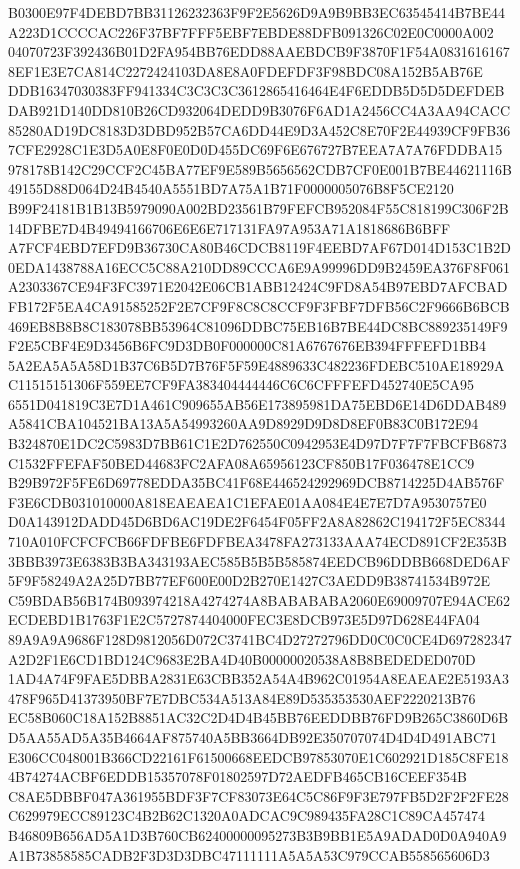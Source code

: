 \documentclass[UTF8,fontset=fandol,zihao=-4,a4paper]{ctexart}
\begin{document}
{{B0300E97F4DEBD7BB31126232363F9F2E5626D9A9B9BB3EC63545414B7BE44A223D1CCCCAC226F37BF7FFF5EBF7EBDE88DFB091326C02E0C0000A002
04070723F392436B01D2FA954BB76EDD88AAEBDCB9F3870F1F54A08316161678EF1E3E7CA814C2272424103DA8E8A0FDEFDF3F98BDC08A152B5AB76E
DDB16347030383FF941334C3C3C3C3612865416464E4F6EDDB5D5D5DEFDEBDAB921D140DD810B26CD932064DEDD9B3076F6AD1A2456CC4A3AA94CACC
85280AD19DC8183D3DBD952B57CA6DD44E9D3A452C8E70F2E44939CF9FB367CFE2928C1E3D5A0E8F0E0D0D455DC69F6E676727B7EEA7A7A76FDDBA15
978178B142C29CCF2C45BA77EF9E589B5656562CDB7CF0E001B7BE44621116B49155D88D064D24B4540A5551BD7A75A1B71F0000005076B8F5CE2120
B99F24181B1B13B5979090A002BD23561B79FEFCB952084F55C818199C306F2B14DFBE7D4B49494166706E6E6E717131FA97A953A71A1818686B6BFF
A7FCF4EBD7EFD9B36730CA80B46CDCB8119F4EEBD7AF67D014D153C1B2D0EDA1438788A16ECC5C88A210DD89CCCA6E9A99996DD9B2459EA376F8F061
A2303367CE94F3FC3971E2042E06CB1ABB12424C9FD8A54B97EBD7AFCBADFB172F5EA4CA91585252F2E7CF9F8C8C8CCF9F3FBF7DFB56C2F9666B6BCB
469EB8B8B8C183078BB53964C81096DDBC75EB16B7BE44DC8BC889235149F9F2E5CBF4E9D3456B6FC9D3DB0F000000C81A6767676EB394FFFEFD1BB4
5A2EA5A5A58D1B37C6B5D7B76F5F59E4889633C482236FDEBC510AE18929AC11515151306F559EE7CF9FA383404444446C6C6CFFFEFD452740E5CA95
6551D041819C3E7D1A461C909655AB56E173895981DA75EBD6E14D6DDAB489A5841CBA104521BA13A5A54993260AA9D8929D9D8D8EF0B83C0B172E94
B324870E1DC2C5983D7BB61C1E2D762550C0942953E4D97D7F7F7FBCFB6873C1532FFEFAF50BED44683FC2AFA08A65956123CF850B17F036478E1CC9
B29B972F5FE6D69778EDDA35BC41F68E446524292969DCB8714225D4AB576FF3E6CDB031010000A818EAEAEA1C1EFAE01AA084E4E7E7D7A9530757E0
D0A143912DADD45D6BD6AC19DE2F6454F05FF2A8A82862C194172F5EC8344710A010FCFCFCB66FDFBE6FDFBEA3478FA273133AAA74ECD891CF2E353B
3BBB3973E6383B3BA343193AEC585B5B5B585874EEDCB96DDBB668DED6AF5F9F58249A2A25D7BB77EF600E00D2B270E1427C3AEDD9B38741534B972E
C59BDAB56B174B093974218A4274274A8BABABABA2060E69009707E94ACE62ECDEBD1B1763F1E2C5727874404000FEC3E8DCB973E5D97D628E44FA04
89A9A9A9686F128D9812056D072C3741BC4D27272796DD0C0C0CE4D697282347A2D2F1E6CD1BD124C9683E2BA4D40B00000020538A8B8BEDEDED070D
1AD4A74F9FAE5DBBA2831E63CBB352A54A4B962C01954A8EAEAE2E5193A3478F965D41373950BF7E7DBC534A513A84E89D535353530AEF2220213B76
EC58B060C18A152B8851AC32C2D4D4B45BB76EEDDBB76FD9B265C3860D6BD5AA55AD5A35B4664AF875740A5BB3664DB92E350707074D4D4D491ABC71
E306CC048001B366CD22161F61500668EEDCB97853070E1C602921D185C8FE184B74274ACBF6EDDB15357078F01802597D72AEDFB465CB16CEEF354B
C8AE5DBBF047A361955BDF3F7CF83073E64C5C86F9F3E797FB5D2F2F2FE28C629979ECC89123C4B2B62C1320A0ADCAC9C989435FA28C1C89CA457474
B46809B656AD5A1D3B760CB62400000095273B3B9BB1E5A9ADAD0D0A940A9A1B73858585CADB2F3D3D3DBC47111111A5A5A53C979CCAB558565606D3
}}
\end{document}
